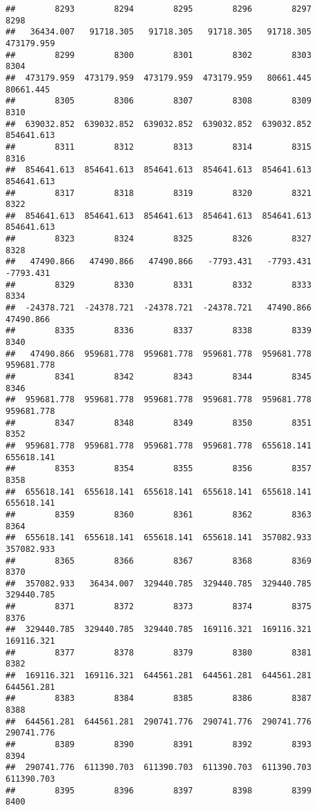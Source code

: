 \documentclass[
]{book}
\begin{document}
\begin{verbatim}
##        8293        8294        8295        8296        8297        8298 
##   36434.007   91718.305   91718.305   91718.305   91718.305  473179.959 
##        8299        8300        8301        8302        8303        8304 
##  473179.959  473179.959  473179.959  473179.959   80661.445   80661.445 
##        8305        8306        8307        8308        8309        8310 
##  639032.852  639032.852  639032.852  639032.852  639032.852  854641.613 
##        8311        8312        8313        8314        8315        8316 
##  854641.613  854641.613  854641.613  854641.613  854641.613  854641.613 
##        8317        8318        8319        8320        8321        8322 
##  854641.613  854641.613  854641.613  854641.613  854641.613  854641.613 
##        8323        8324        8325        8326        8327        8328 
##   47490.866   47490.866   47490.866   -7793.431   -7793.431   -7793.431 
##        8329        8330        8331        8332        8333        8334 
##  -24378.721  -24378.721  -24378.721  -24378.721   47490.866   47490.866 
##        8335        8336        8337        8338        8339        8340 
##   47490.866  959681.778  959681.778  959681.778  959681.778  959681.778 
##        8341        8342        8343        8344        8345        8346 
##  959681.778  959681.778  959681.778  959681.778  959681.778  959681.778 
##        8347        8348        8349        8350        8351        8352 
##  959681.778  959681.778  959681.778  959681.778  655618.141  655618.141 
##        8353        8354        8355        8356        8357        8358 
##  655618.141  655618.141  655618.141  655618.141  655618.141  655618.141 
##        8359        8360        8361        8362        8363        8364 
##  655618.141  655618.141  655618.141  655618.141  357082.933  357082.933 
##        8365        8366        8367        8368        8369        8370 
##  357082.933   36434.007  329440.785  329440.785  329440.785  329440.785 
##        8371        8372        8373        8374        8375        8376 
##  329440.785  329440.785  329440.785  169116.321  169116.321  169116.321 
##        8377        8378        8379        8380        8381        8382 
##  169116.321  169116.321  644561.281  644561.281  644561.281  644561.281 
##        8383        8384        8385        8386        8387        8388 
##  644561.281  644561.281  290741.776  290741.776  290741.776  290741.776 
##        8389        8390        8391        8392        8393        8394 
##  290741.776  611390.703  611390.703  611390.703  611390.703  611390.703 
##        8395        8396        8397        8398        8399        8400 

\end{verbatim}
\end{document}
